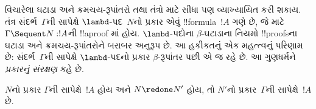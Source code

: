 \documentclass[../../../include/open-logic-section]{subfiles}
\begin{document}


વિચારેલા ઘટાડા અને ક્રમચય-રૂપાંતરો
 તથા  તંત્રો માટે સીધા પણ વ્યાખ્યાયિત કરી શકાય.
 તંત્ર સંદર્ભ~$\Gamma$ની સાપેક્ષે
$\lambd$-પદ~$N$નો પ્રકાર એવું !!{formula}~$!A$ ગણે છે,
જે માટે $\Gamma \Sequent N : !A$ની
!!a{proof} માં હોય.
$\lambd$-પદોના $\beta$-ઘટાડાના નિયમો
!!{proof}sના ઘટાડા અને ક્રમચય-રૂપાંતરોને બરાબર અનુરૂપ છે.
આ હકીકતનું એક મહત્ત્વનું પરિણામ છે:
સંદર્ભ~$\Gamma$ની સાપેક્ષે $\lambd$-પદનો પ્રકાર
$\beta$-રૂપાંતર પછી એ જ રહે છે.
આ ગુણધર્મને \emph{પ્રકારનું સંરક્ષણ} કહે છે.

\begin{prop}
$N$નો પ્રકાર $\Gamma$ની સાપેક્ષે~$!A$ હોય
અને $N \redone N'$ હોય,
તો $N'$નો પ્રકાર~$\Gamma$ની સાપેક્ષે~$!A$ છે.
\end{prop}
\end{document}
